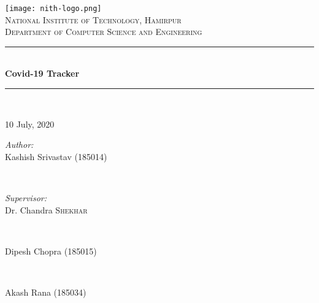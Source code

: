 \documentclass[11pt,a4paper]{report}
\begin{document}
\begin{titlepage}

    \newcommand{\HRule}{\rule{\linewidth}{0.5mm}} %
    
    \center 
    \texttt{[image: nith-logo.png]}\\ %
    

    \textsc{\Large National Institute of Technology, Hamirpur}\\[0.5cm] %
    \textsc{\large Department of Computer Science and Engineering}\\[0.5cm] %
    
    \HRule \\[0.4cm]
    { \huge \bfseries Covid-19 Tracker}\\[0.2cm] %
    \HRule \\[1cm]
  
    \date{date}{10 }{July, }{2020}\\[1cm]

    \begin{minipage}{0.5\textwidth}
        \begin{flushleft} \large
        \emph{Author:}\\
        \vspace{2mm}
        Kashish Srivastav (185014)
        \end{flushleft}
        \end{minipage}   
    ~
    \begin{minipage}{0.4\textwidth}
    \begin{flushright} \large
    \emph{Supervisor:} \\
    \vspace{2mm}
    Dr. Chandra \textsc{Shekhar} %
    \end{flushright}
    \end{minipage}
    ~
    \begin{minipage}{0.93\textwidth}
        \begin{flushleft} \large
        \vspace{1mm}
        Dipesh Chopra (185015)
        \end{flushleft}
        \end{minipage} 
    ~    
    \begin{minipage}{0.93\textwidth}
        \begin{flushleft} \large
        \vspace{1mm}
        Akash Rana (185034)
        \end{flushleft}
        \end{minipage}\\[2cm]
    
    \vfill 
    
    \end{titlepage}
    
\end{document}
